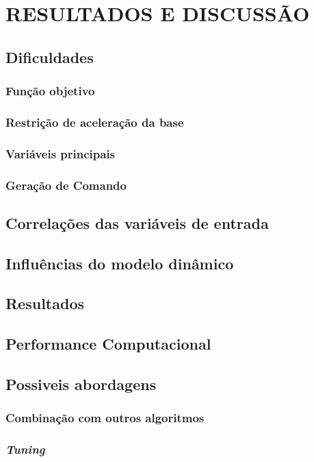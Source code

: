 \chapter{RESULTADOS E DISCUSSÃO}

\section{Dificuldades}
\subsection{Função objetivo}
\subsection{Restrição de aceleração da base}
\subsection{Variáveis principais}
\subsection{Geração de Comando}

\section{Correlações das variáveis de entrada}
\section{Influências do modelo dinâmico}

\section{Resultados}

\section{Performance Computacional}

\section{Possiveis abordagens}
\subsection{Combinação com outros algoritmos}
\subsection{\textit{Tuning}}



